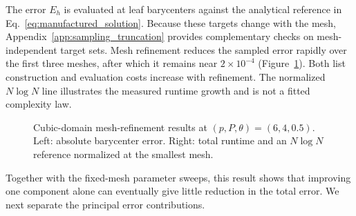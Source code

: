 \documentclass[a4paper,pdflatex,sn-mathphys-num]{sn-jnl}
\theoremstyle{thmstyleone}
\begin{document}
The error $E_h$ is evaluated at leaf barycenters against the analytical reference in Eq.~\eqref{eq:manufactured_solution}. Because these targets change with the mesh, Appendix~\ref{app:sampling_truncation} provides complementary checks on mesh-independent target sets. Mesh refinement reduces the sampled error rapidly over the first three meshes, after which it remains near $2\times10^{-4}$ (Figure~\ref{fig:single_center_hnl_scaling}). Both list construction and evaluation costs increase with refinement. The normalized $N\log N$ line illustrates the measured runtime growth and is not a fitted complexity law.

\begin{figure}[!htbp]
\centering
{}
\caption{Cubic-domain mesh-refinement results at $(p,P,\theta)=(6,4,0.5)$. Left: absolute barycenter error. Right: total runtime and an $N\log N$ reference normalized at the smallest mesh.}
\label{fig:single_center_hnl_scaling}
\end{figure}

Together with the fixed-mesh parameter sweeps, this result shows that improving one component alone can eventually give little reduction in the total error. We next separate the principal error contributions.

\end{document}
